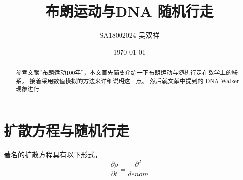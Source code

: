 \documentclass[
reprint,
amsmath,
amssymb,
aps,
prl
]{revtex4-1}
\begin{document}
\title{布朗运动与DNA 随机行走}
  \author{SA18002024  吴双祥}
  \date{\today}

  \begin{abstract}
    参考文献“布朗运动100年”，本文首先简要介绍一下布朗运动与随机行走在数学上的联系。
    接着采用数值模拟的方法来详细说明这一点。
    然后就文献中提到的 DNA Walker 现象进行
  \end{abstract}

  \maketitle

  \section{扩散方程与随机行走}%
  \label{sec:bu_lang_yun_dong_yu_sui_ji_xing_zou_}
  著名的扩散方程具有以下形式，
  \begin{equation}
     \frac{\partial \rho}{\partial t} = \frac{\partial^2}{denom}  
  \end{equation}
 
 
\end{document}
